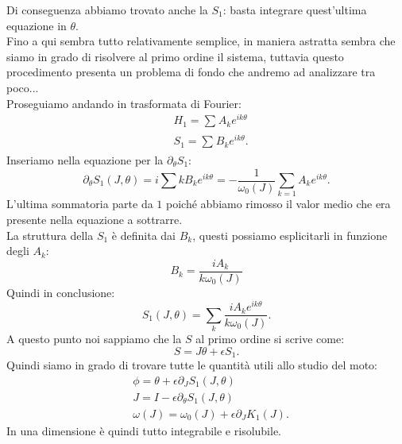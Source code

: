 Di conseguenza abbiamo trovato anche la $S_1$: basta integrare quest'ultima equazione in $\theta  $.\\
Fino a qui sembra tutto relativamente semplice, in maniera astratta sembra che siamo in grado di risolvere al primo ordine il sistema, tuttavia questo procedimento presenta un problema di fondo che andremo ad analizzare tra poco...\\
Proseguiamo andando in trasformata di Fourier:
\[\begin{aligned}
    & H_1 = \sum_{}^{} A_k e^{ik\theta}\\
    & S_1 = \sum_{}^{} B_k e^{ik\theta}
.\end{aligned}\]
Inseriamo nella equazione per la $\partial_{\theta} S_1$:
\[
    \partial_{\theta  }S_1(J, \theta  ) = i \sum_{}^{} kB_ke^{ik\theta} = -\frac{1}{\omega_0(J)}\sum_{k=1}^{} A_ke^{ik\theta  }
.\] 
L'ultima sommatoria parte da $1$  poiché abbiamo rimosso il valor medio che era presente nella equazione a sottrarre.\\
La struttura della $S_1$  è definita dai $B_k$, questi possiamo esplicitarli in funzione degli $A_k$:
\begin{equation}
    B_k = \frac{iA_k}{k\omega_0(J)}
    \label{eq:17_esp_S_1}
\end{equation}
Quindi in conclusione:
\[
    S_1(J, \theta) = \sum_{k}^{} \frac{iA_ke^{ik\theta  }}{k\omega_0(J) }
.\] 
A questo punto noi sappiamo che la $S$ al primo ordine si scrive come:
\[
    S = J\theta +\epsilon S_1
.\] 
Quindi siamo in grado di trovare tutte le quantità utili allo studio del moto:
\[\begin{aligned}
    & \phi  = \theta +\epsilon\partial_{J}S_1(J,\theta  ) \\
    & J = I - \epsilon\partial_{\theta  }S_1(J,\theta) \\
    & \omega (J) = \omega_0(J) + \epsilon\partial_{J}K_1(J) 
.\end{aligned}\]
In una dimensione è quindi tutto integrabile e risolubile. 
